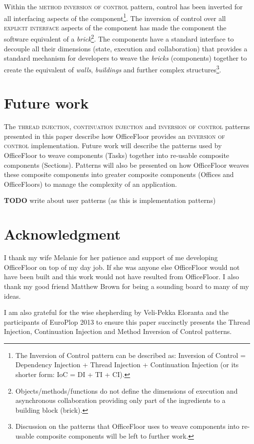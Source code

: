 \documentclass[prodmode]{style/acmlarge}
\begin{document}
Within the \textsc{method inversion of control} pattern, control has been
inverted for all interfacing aspects of the component\footnote{The Inversion of
Control pattern can be described as: Inversion of Control = Dependency Injection
+ Thread Injection + Continuation Injection (or its shorter form: IoC = DI + TI
+ CI).}.  The inversion of control over all \textsc{explicit interface} aspects
of the component has made the component the software equivalent of a
\textit{brick}\footnote{Objects/methods/functions do not define the dimensions
of execution and asynchronous collaboration providing only part of the
ingredients to a building block (brick).}.  The components have a standard
interface to decouple all their dimensions (state, execution and collaboration)
that provides a standard mechanism for developers to weave the \textit{bricks}
(components) together to create the equivalent of \textit{walls},
\textit{buildings} and further complex structures\footnote{Discussion on the
patterns that OfficeFloor \cite{officefloor} uses to weave components into
re-usable composite components will be left to further work.}.



\section{Future work}

The \textsc{thread injection}, \textsc{continuation injection} and
\textsc{inversion of control} patterns presented in this paper describe how
OfficeFloor \cite{officefloor} provides an \textsc{inversion of control}
implementation.  Future work will describe the patterns used by OfficeFloor to
weave components (Tasks) together into re-usable composite components
(Sections).  Patterns will also be presented on how OfficeFloor weaves these
composite components into greater composite components (Offices and
OfficeFloors) to manage the complexity of an application.

\textbf{TODO} write about user patterns (as this is implementation patterns)



\section*{Acknowledgment} 

I thank my wife Melanie for her patience and support
of me developing OfficeFloor on top of my day job.  If she was anyone else
OfficeFloor would not have been built and this work would not have resulted from
OfficeFloor.  I also thank my good friend Matthew Brown for being a sounding
board to many of my ideas.

I am also grateful for the wise shepherding by Veli-Pekka Eloranta and the
participants of EuroPlop 2013 to ensure this paper succinctly presents the
Thread Injection, Continuation Injection and Method Inversion of Control
patterns.




\end{document}
